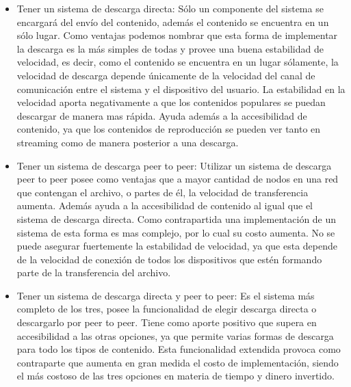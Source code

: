\documentclass[11pt, a4paper, spanish]{article}
\begin{document}
	\begin{itemize}
		\item {Tener un sistema de descarga directa: S\'olo un componente del sistema se encargar\'a del env\'io del contenido, adem\'as el contenido se encuentra en un s\'olo lugar. Como ventajas podemos nombrar que esta forma de implementar la descarga es la m\'as simples de todas y provee una buena estabilidad de velocidad, es decir, como el contenido se encuentra en un lugar s\'olamente, la velocidad de descarga depende \'unicamente de la velocidad del canal de comunicaci\'on entre el sistema y el dispositivo del usuario. La estabilidad en la velocidad aporta negativamente a que los contenidos populares se puedan descargar de manera mas r\'apida. Ayuda adem\'as a la accesibilidad de contenido, ya que los contenidos de reproducci\'on se pueden ver tanto en streaming como de manera posterior a una descarga.}
		\item {Tener un sistema de descarga peer to peer: Utilizar un sistema de descarga peer to peer  posee como ventajas que a mayor cantidad de nodos en una red que contengan el archivo, o partes de \'el, la velocidad de transferencia aumenta. Adem\'as ayuda a la accesibilidad de contenido al igual que el sistema de descarga directa. Como contrapartida una implementaci\'on de un sistema de esta forma es mas complejo, por lo cual su costo aumenta. No se puede asegurar fuertemente la estabilidad de velocidad, ya que esta depende de la velocidad de conexi\'on de todos los dispositivos que est\'en formando parte de la transferencia del archivo.}
		\item {Tener un sistema de descarga directa y peer to peer: Es el sistema m\'as completo de los tres, posee la funcionalidad de elegir descarga directa o descargarlo por peer to peer. Tiene como aporte positivo que supera en accesibilidad a las otras opciones, ya que permite varias formas de descarga para todo los tipos de contenido. Esta funcionalidad extendida provoca como contraparte que aumenta en gran medida el costo de implementaci\'on, siendo el m\'as costoso de las tres opciones en materia de tiempo y dinero invertido.}
		\end{itemize}
\end{document}
